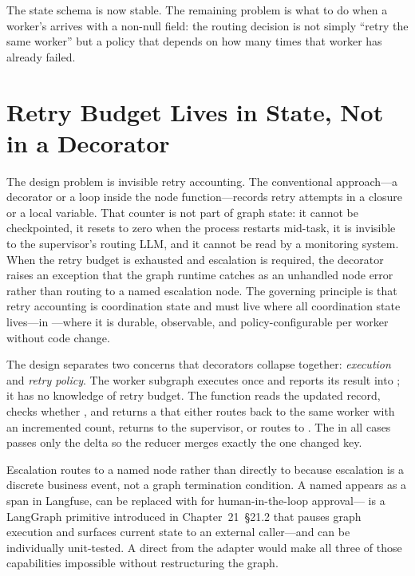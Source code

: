 The state schema is now stable. The remaining problem is what to do when a
worker's  arrives with a non-null  field:
the routing decision is not simply ``retry the same worker'' but a policy
that depends on how many times that worker has already failed.


\section{Retry Budget Lives in State, Not in a Decorator}
\label{sec:sup-fallback}

The design problem is invisible retry accounting. The conventional
approach---a  decorator or a  loop inside the
node function---records retry attempts in a closure or a local variable.
That counter is not part of graph state: it cannot be checkpointed, it
resets to zero when the process restarts mid-task, it is invisible to the
supervisor's routing LLM, and it cannot be read by a monitoring system.
When the retry budget is exhausted and escalation is required, the
decorator raises an exception that the graph runtime catches as an
unhandled node error rather than routing to a named escalation node. The
governing principle is that retry accounting is coordination state and must
live where all coordination state lives---in ---where it
is durable, observable, and policy-configurable per worker without code
change.

The design separates two concerns that decorators collapse together:
\emph{execution} and \emph{retry policy}. The worker subgraph executes
once and reports its result into ; it has no
knowledge of retry budget. The function  reads
the updated record, checks whether , and
returns a  that either routes back to the same worker with
an incremented  count, returns to the supervisor, or routes
to . The  in all cases passes only
the delta  so the 
reducer merges exactly the one changed key.

Escalation routes to a named node rather than directly to 
because escalation is a discrete business event, not a graph termination
condition. A named  appears as a span in Langfuse,
can be replaced with  for human-in-the-loop
approval--- is a LangGraph primitive introduced in
Chapter~21~\S21.2 that pauses graph execution and surfaces current state
to an external caller---and can be individually unit-tested. A direct
 from the adapter would make all three of those
capabilities impossible without restructuring the graph.

